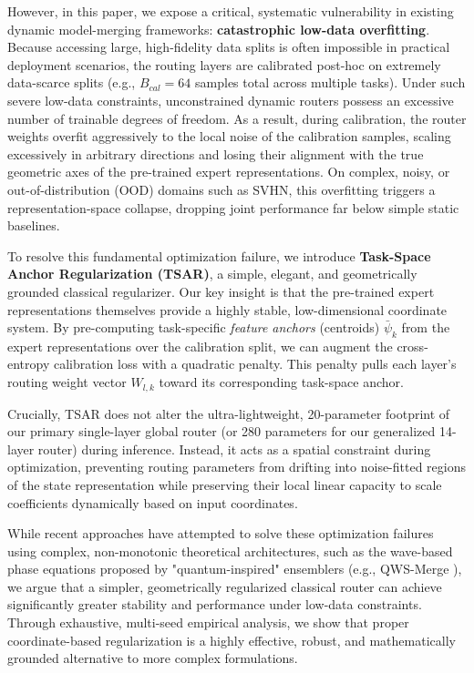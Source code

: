 However, in this paper, we expose a critical, systematic vulnerability in existing dynamic
model-merging frameworks: \textbf{catastrophic low-data overfitting}. Because accessing large,
high-fidelity data splits is often impossible in practical deployment scenarios, the routing layers
are calibrated post-hoc on extremely data-scarce splits (e.g., $B_{cal} = 64$ samples total across
multiple tasks). Under such severe low-data constraints, unconstrained dynamic routers possess an
excessive number of trainable degrees of freedom. As a result, during calibration, the router
weights overfit aggressively to the local noise of the calibration samples, scaling excessively in
arbitrary directions and losing their alignment with the true geometric axes of the pre-trained
expert representations. On complex, noisy, or out-of-distribution (OOD) domains such as SVHN, this
overfitting triggers a representation-space collapse, dropping joint performance far below simple
static baselines.

To resolve this fundamental optimization failure, we introduce \textbf{Task-Space Anchor
Regularization (TSAR)}, a simple, elegant, and geometrically grounded classical regularizer. Our key
insight is that the pre-trained expert representations themselves provide a highly stable,
low-dimensional coordinate system. By pre-computing task-specific \emph{feature anchors} (centroids)
$\bar{\psi}_k$ from the expert representations over the calibration split, we can augment the
cross-entropy calibration loss with a quadratic penalty. This penalty pulls each layer's routing
weight vector $W_{l, k}$ toward its corresponding task-space anchor. 

Crucially, TSAR does not alter the ultra-lightweight, 20-parameter footprint of our primary single-layer global router (or 280 parameters for our generalized 14-layer router) during inference. Instead, it acts as a spatial constraint during optimization, preventing routing
parameters from drifting into noise-fitted regions of the state representation while preserving
their local linear capacity to scale coefficients dynamically based on input coordinates.

While recent approaches have attempted to solve these optimization failures using complex,
non-monotonic theoretical architectures, such as the wave-based phase equations proposed by
"quantum-inspired" ensemblers (e.g., QWS-Merge \cite{shavit2023quantum}), we argue that a simpler,
geometrically regularized classical router can achieve significantly greater stability and
performance under low-data constraints. Through exhaustive, multi-seed empirical analysis, we show
that proper coordinate-based regularization is a highly effective, robust, and mathematically
grounded alternative to more complex formulations.


